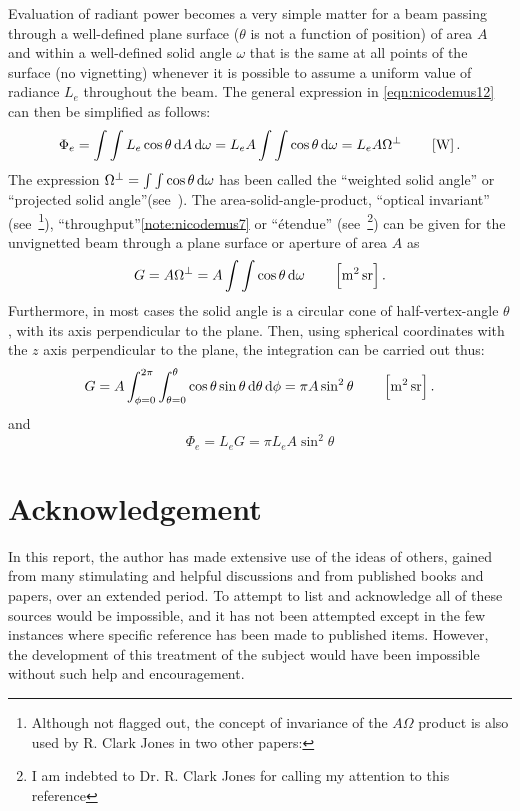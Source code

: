 Evaluation of radiant power becomes a very simple matter for a beam passing
through
a well-defined plane surface ($\theta$ is not a function of position) of area
$A$
and within a well-defined solid angle $\omega$ that is the same at all points of
the
surface (no vignetting) whenever it is possible to assume a uniform value of
radiance
$L_e$ throughout the beam. The general expression in \cref{eqn:nicodemus12} can
then be simplified as follows:
\begin{equation}
\Phi_e = \int \int L_e \cos\theta \mathop{}\!\mathrm{d} A \mathop{}\!\mathrm{d} \omega = L_e A \int \int \cos\theta
\mathop{}\!\mathrm{d} \omega =
L_e A \Omega^\perp
\qquad \left[\si{\watt}\right].
\end{equation}
The expression $\Omega^\perp = \int \int \cos\theta \mathop{}\!\mathrm{d} \omega$ has been called the
``weighted solid angle'' or ``projected solid angle''(see~).
The area-solid-angle-product, ``optical invariant''
(see~\footnote{Although not flagged out, the concept of
invariance of the $A\Omega$ product is also used by R. Clark Jones in two other
papers: }), ``throughput''\cref{note:nicodemus7} or
``\'etendue'' (see~\footnote{I am indebted to Dr. R. Clark
Jones for calling my attention to this reference}) can be given for the
unvignetted beam through a plane surface or aperture of area $A$ as
\begin{equation}
G = A\Omega^\perp = A \int \int \cos\theta \d \omega
\qquad \left[\si{\square\meter\steradian}\right].
\end{equation}
Furthermore, in most cases the solid angle is a circular cone of
half-vertex-angle
$\theta$, with its axis perpendicular to the plane. Then, using spherical
coordinates
with the $z$ axis perpendicular to the plane, the integration can be carried out thus:
\begin{equation}
G = A\int_{\phi = 0}^{2\pi} \int_{\theta=0}^{\theta}\cos\theta \sin\theta\d\theta \d\phi
=\pi A \sin^2\theta
\qquad \left[\si{\square\meter\steradian}\right].
\end{equation}
and
\begin{equation}
\Phi_e = L_e G = \pi L_e A \sin^2\theta
\end{equation}

\section{Acknowledgement}

In this report, the author has made extensive use of the ideas of others, gained
from many stimulating and helpful discussions and from published books and
papers, over an extended period. To attempt to list and acknowledge all of these
sources would be impossible, and it has not been attempted except in the few
instances where specific reference has been made to published items. However,
the development of this treatment of the subject would have been impossible
without such help and encouragement.

\let\originalbibsection\bibsection
\renewcommand{\bibsection}{\section{\refname}}
\let\bibsection\originalbibsection
